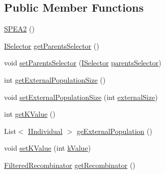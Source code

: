 \subsection*{Public Member Functions}
\begin{DoxyCompactItemize}
\item 
\hyperlink{classnet_1_1sf_1_1jclec_1_1algorithm_1_1multiobjective_1_1_s_p_e_a2_a58047c5115d6392bc0a1dfffac473a2c}{S\-P\-E\-A2} ()
\item 
\hyperlink{interfacenet_1_1sf_1_1jclec_1_1_i_selector}{I\-Selector} \hyperlink{classnet_1_1sf_1_1jclec_1_1algorithm_1_1multiobjective_1_1_s_p_e_a2_a72172a97c87003f6df4017c983af2f69}{get\-Parents\-Selector} ()
\item 
void \hyperlink{classnet_1_1sf_1_1jclec_1_1algorithm_1_1multiobjective_1_1_s_p_e_a2_a6d5de18eabfdd5afd3459bb2de7e536c}{set\-Parents\-Selector} (\hyperlink{interfacenet_1_1sf_1_1jclec_1_1_i_selector}{I\-Selector} \hyperlink{classnet_1_1sf_1_1jclec_1_1algorithm_1_1multiobjective_1_1_s_p_e_a2_ae8da0f389d94013c1d11b0d277dff0a9}{parents\-Selector})
\item 
int \hyperlink{classnet_1_1sf_1_1jclec_1_1algorithm_1_1multiobjective_1_1_s_p_e_a2_a7434792db183f8062329e95b80764a48}{get\-External\-Population\-Size} ()
\item 
void \hyperlink{classnet_1_1sf_1_1jclec_1_1algorithm_1_1multiobjective_1_1_s_p_e_a2_a71c5793605e847c8b07bc50618023618}{set\-External\-Population\-Size} (int \hyperlink{classnet_1_1sf_1_1jclec_1_1algorithm_1_1multiobjective_1_1_s_p_e_a2_a0e2715b1630c1863b6dbaf00e2c37f5e}{external\-Size})
\item 
int \hyperlink{classnet_1_1sf_1_1jclec_1_1algorithm_1_1multiobjective_1_1_s_p_e_a2_a9b8874c0eaaf3942eb9101cebad323b5}{get\-K\-Value} ()
\item 
List$<$ \hyperlink{interfacenet_1_1sf_1_1jclec_1_1_i_individual}{I\-Individual} $>$ \hyperlink{classnet_1_1sf_1_1jclec_1_1algorithm_1_1multiobjective_1_1_s_p_e_a2_ad5d440ef9b3046e908ac8cf81bf4bcd7}{ge\-External\-Population} ()
\item 
void \hyperlink{classnet_1_1sf_1_1jclec_1_1algorithm_1_1multiobjective_1_1_s_p_e_a2_abc3a249a68dc8ddfad2d6f5782669cea}{set\-K\-Value} (int \hyperlink{classnet_1_1sf_1_1jclec_1_1algorithm_1_1multiobjective_1_1_s_p_e_a2_a31f4793e1cf92f269cdc6eedd71fd383}{k\-Value})
\item 
\hyperlink{classnet_1_1sf_1_1jclec_1_1base_1_1_filtered_recombinator}{Filtered\-Recombinator} \hyperlink{classnet_1_1sf_1_1jclec_1_1algorithm_1_1multiobjective_1_1_s_p_e_a2_a808c39d4bf6ac48273084967d8430469}{get\-Recombinator} ()

\end{DoxyCompactItemize}
